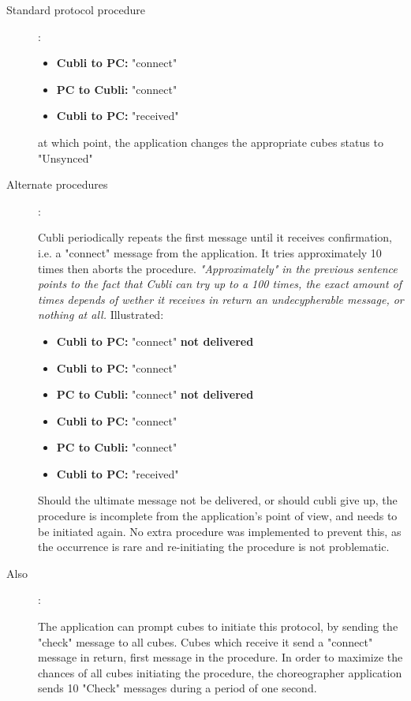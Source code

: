\begin{description}
\item[Standard protocol procedure]:

\begin{itemize}
\item[] \textbf{Cubli to PC:} "connect"
\item[] \textbf{PC to Cubli:} "connect"
\item[] \textbf{Cubli to PC:} "received"
\end{itemize}

at which point, the application changes the appropriate cubes status to "Unsynced"
\item[Alternate procedures]:

Cubli periodically repeats the first message until it receives confirmation, i.e. a "connect" message from the application. It tries approximately 10 times then aborts the procedure. \textit{"Approximately" in the previous sentence points to the fact that Cubli can try up to a 100 times, the exact amount of times depends of wether it receives in return an undecypherable message, or nothing at all.} Illustrated:

\begin{itemize}
\item[] \textbf{Cubli to PC:} "connect" \textbf{not delivered}
\item[] \textbf{Cubli to PC:} "connect"
\item[] \textbf{PC to Cubli:} "connect" \textbf{not delivered}
\item[] \textbf{Cubli to PC:} "connect"
\item[] \textbf{PC to Cubli:} "connect" 
\item[] \textbf{Cubli to PC:} "received"
\end{itemize}

Should the ultimate message not be delivered, or should cubli give up, the procedure is incomplete from the application's point of view, and needs to be initiated again. No extra procedure was implemented to prevent this, as the occurrence is rare and re-initiating the procedure is not problematic.


\item[Also]:

The application can prompt cubes to initiate this protocol, by sending the "check" message to all cubes. Cubes which receive it send a "connect" message in return, first message in the procedure. In order to maximize the chances of all cubes initiating the procedure, the choreographer application sends 10 "Check" messages during a period of one second.


\end{description}


